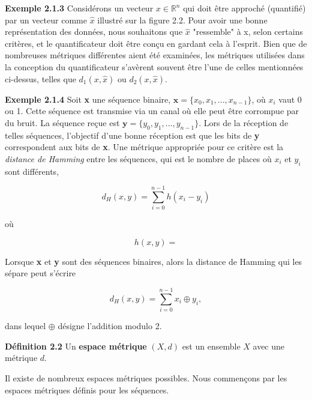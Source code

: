 \documentclass[11pt,twoside,a4paper]{article}
\begin{document}
\textbf{Exemple 2.1.3} Considérons un vecteur $x \in \mathbb{R}^n$ qui doit être approché (quantifié) par un vecteur comme $\hat{x}$ illustré sur la figure 2.2. 
Pour avoir une bonne représentation des données, nous souhaitons que $\hat{x}$ "ressemble" à x, selon certains critères, et le quantificateur doit être conçu en gardant cela à l'esprit. 
Bien que de nombreuses métriques différentes aient été examinées, les métriques utilisées dans la conception du quantificateur s'avèrent souvent être l'une de celles mentionnées 
ci-dessus, telles que $d_1(x, \hat{x})$ ou $d_2(x, \hat{x})$.


\textbf{Exemple 2.1.4} Soit \textbf{x} une séquence binaire, $\textbf{x} = \{x_0, x_1,...,x_{n-1}\}$, où $x_i$ vaut 0 ou 1. Cette séquence est transmise via un canal où elle peut être 
corrompue par du bruit. La séquence reçue est $\textbf{y} = \{y_0, y_1,...,y_{n-1}\}$. Lors de la réception de telles séquences, l'objectif d'une bonne réception est que les bits de \textbf{y}
correspondent aux bits de \textbf{x}. Une métrique appropriée pour ce critère est la \textit{distance de Hamming} entre les séquences, qui est le nombre de places où $x_i$ et $y_i$ sont différents,

\begin{equation*}
  d_H(x, y) = \sum_{i=0}^{n-1} h(x_i - y_i)
\end{equation*}

où

\begin{equation*}
  h(x, y) = 
\end{equation*}

Lorsque \textbf{x} et \textbf{y} sont des séquences binaires, alors la distance de Hamming qui les sépare peut s'écrire

\begin{equation*}
  d_H(x, y) = \sum_{i=0}^{n-1} x_i \oplus y_i ,
\end{equation*}

dans lequel $\oplus$ désigne l'addition modulo 2.


\textbf{Définition 2.2} Un \textbf{espace métrique} $(X, d)$ est un ensemble $X$ avec une métrique $d$.

Il existe de nombreux espaces métriques possibles. Nous commençons par les espaces métriques définis pour les séquences.
\end{document}
